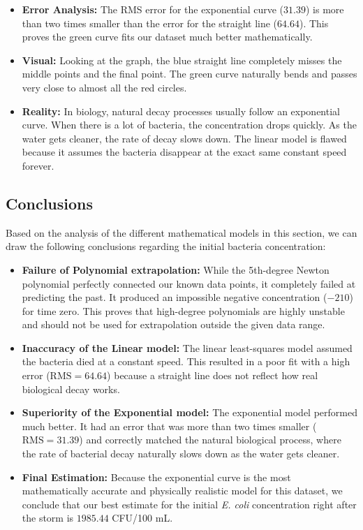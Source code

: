 \begin{itemize}
    \item \textbf{Error Analysis:} The RMS error for the exponential curve ($31.39$) is more than two times smaller than the error for the straight line ($64.64$). This proves the green curve fits our dataset much better mathematically.
    \item \textbf{Visual:} Looking at the graph, the blue straight line completely misses the middle points and the final point. The green curve naturally bends and passes very close to almost all the red circles.
    \item \textbf{Reality:} In biology, natural decay processes usually follow an exponential curve. When there is a lot of bacteria, the concentration drops quickly. As the water gets cleaner, the rate of decay slows down. The linear model is flawed because it assumes the bacteria disappear at the exact same constant speed forever.
\end{itemize}


\subsection{Conclusions}

Based on the analysis of the different mathematical models in this section, we can draw the following conclusions regarding the initial bacteria concentration:

\begin{itemize}
    \item \textbf{Failure of Polynomial extrapolation:} While the 5th-degree Newton polynomial perfectly connected our known data points, it completely failed at predicting the past. It produced an impossible negative concentration ($-210$) for time zero. This proves that high-degree polynomials are highly unstable and should not be used for extrapolation outside the given data range.

    \item \textbf{Inaccuracy of the Linear model:} The linear least-squares model assumed the bacteria died at a constant speed. This resulted in a poor fit with a high error ($\text{RMS} = 64.64$) because a straight line does not reflect how real biological decay works.

    \item \textbf{Superiority of the Exponential model:} The exponential model performed much better. It had an error that was more than two times smaller ($\text{RMS} = 31.39$) and correctly matched the natural biological process, where the rate of bacterial decay naturally slows down as the water gets cleaner.

    \item \textbf{Final Estimation:} Because the exponential curve is the most mathematically accurate and physically realistic model for this dataset, we conclude that our best estimate for the initial \textit{E. coli} concentration right after the storm is $1985.44$ CFU/100 mL.
\end{itemize}